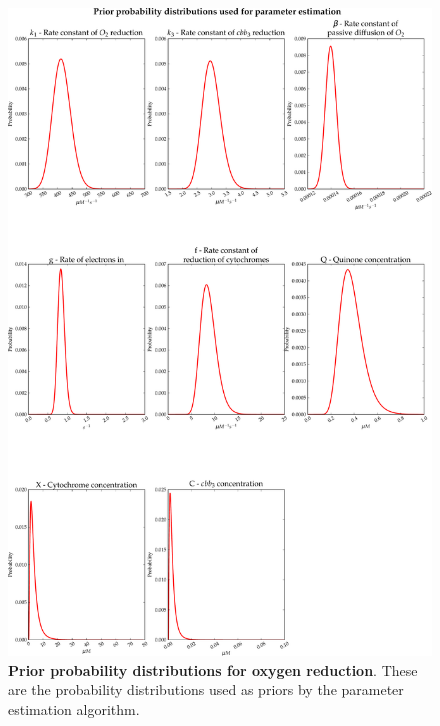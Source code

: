 \begin{figure}[p]
 \centering
 \includegraphics[width=15cm]{./05-oxygenreduction/data/priors1.pdf}
 \caption[Prior probability distributions for oxygen reduction]{{\bf Prior probability distributions for oxygen reduction}. These are the probability distributions used as priors by the parameter estimation algorithm.
 \label{fig:oxypriors}}
\end{figure}
\afterpage{\clearpage}

